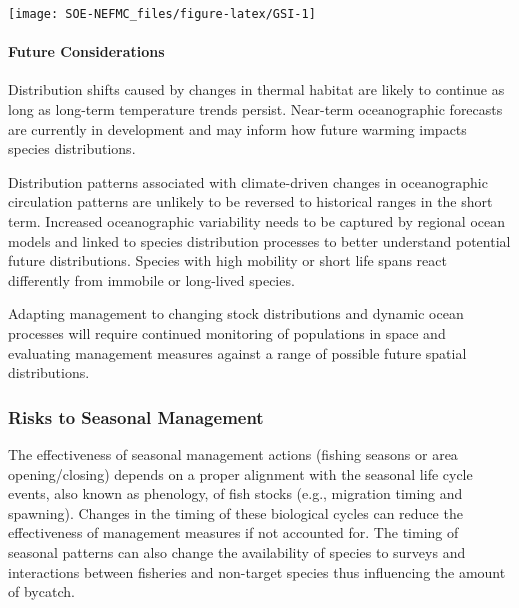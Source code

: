 \documentclass[
  10pt,
]{article}
\let\origfigure\figure
\let\endorigfigure\endfigure
\renewenvironment{figure}[1][2] {
    \expandafter\origfigure\expandafter[H]
} {
    \endorigfigure
}
\begin{document}
\begin{figure}

{\centering \texttt{[image: SOE-NEFMC\_files/figure-latex/GSI-1]} 

}

\caption{Index representing changes in the location of the Gulf Stream north wall. Positive values represent a more northerly Gulf Stream position.}\label{fig:GSI}
\end{figure}

\hypertarget{future-considerations}{%
\paragraph{Future Considerations}\label{future-considerations}}

Distribution shifts caused by changes in thermal habitat are likely to continue as long as long-term temperature trends persist. Near-term oceanographic forecasts are currently in development and may inform how future warming impacts species distributions.

Distribution patterns associated with climate-driven changes in oceanographic circulation patterns are unlikely to be reversed to historical ranges in the short term. Increased oceanographic variability needs to be captured by regional ocean models and linked to species distribution processes to better understand potential future distributions. Species with high mobility or short life spans react differently from immobile or long-lived species.

Adapting management to changing stock distributions and dynamic ocean processes will require continued monitoring of populations in space and evaluating management measures against a range of possible future spatial distributions.

\hypertarget{risks-to-seasonal-management}{%
\subsubsection{Risks to Seasonal Management}\label{risks-to-seasonal-management}}

The effectiveness of seasonal management actions (fishing seasons or area opening/closing) depends on a proper alignment with the seasonal life cycle events, also known as phenology, of fish stocks (e.g., migration timing and spawning). Changes in the timing of these biological cycles can reduce the effectiveness of management measures if not accounted for. The timing of seasonal patterns can also change the availability of species to surveys and interactions between fisheries and non-target species thus influencing the amount of bycatch.
\end{document}
